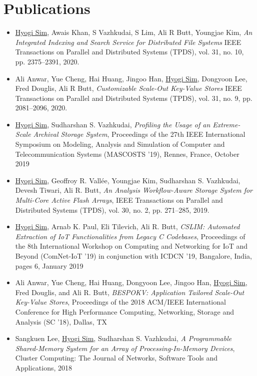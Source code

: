 \section{Publications}
\begin{itemize}
\item \underline{Hyogi Sim}, Awais Khan, S Vazhkudai, S Lim, Ali R Butt, Youngjae Kim,
  {\it An Integrated Indexing and Search Service for Distributed File Systems}
  IEEE Transactions on Parallel and Distributed Systems (TPDS), 
  vol. 31, no. 10, pp. 2375–2391, 2020.
\item Ali Anwar, Yue Cheng, Hai Huang, Jingoo Han, \underline{Hyogi Sim},
      Dongyoon Lee, Fred Douglis, Ali R Butt,
  {\it Customizable Scale-Out Key-Value Stores}
  IEEE Transactions on Parallel and Distributed Systems (TPDS),
  vol. 31, no. 9, pp. 2081–2096, 2020.
\item \underline{Hyogi Sim}, Sudharshan S. Vazhkudai,
  {\it Profiling the Usage of an Extreme-Scale Archival Storage System},
  Proceedings of the 27th IEEE International Symposium on Modeling, Analysis and Simulation of Computer and Telecommunication Systems
  (MASCOSTS '19), Rennes, France, October 2019
\item \underline{Hyogi Sim}, Geoffroy R. Vall\'ee,
	Youngjae Kim, Sudharshan S. Vazhkudai, Devesh Tiwari, Ali R. Butt,
  {\it An Analysis Workflow-Aware Storage System for Multi-Core Active Flash Arrays},
  IEEE Transactions on Parallel and Distributed Systems (TPDS), 
  vol. 30, no. 2, pp. 271–285, 2019.
\item \underline{Hyogi Sim}, Arnab K. Paul, Eli Tilevich, Ali R. Butt,
  {\it CSLIM: Automated Extraction of IoT Functionalities from Legacy C Codebases},
  Proceedings of the 8th International Workshop on Computing and Networking for
  IoT and Beyond (ComNet-IoT ’19) in conjunction with ICDCN '19, Bangalore,
  India, pages 6, January 2019
\item Ali Anwar, Yue Cheng, Hai Huang, Dongyoon Lee, Jingoo Han, \underline{Hyogi Sim},
  Fred Douglis, and Ali R. Butt,
  {\it BESPOKV: Application Tailored Scale-Out Key-Value Stores},
  Proceedings of the 2018 ACM/IEEE International Conference for High
  Performance Computing, Networking, Storage and Analysis (SC '18), Dallas, TX
\item Sangkuen Lee, \underline{Hyogi Sim}, Sudharshan S. Vazhkudai,
  {\it A Programmable Shared-Memory System for an Array of Processing-In-Memory Devices},
  Cluster Computing: The Journal of Networks, Software Tools and Applications, 2018

\end{itemize}
